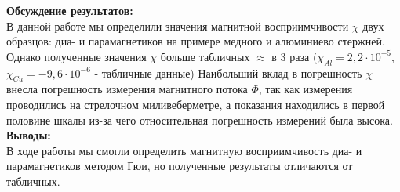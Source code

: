 \documentclass[a4paper, 12pt]{article}%
\begin{document}
	\newpage
	
	\textbf{Обсуждение результатов: }\\
	
	В данной работе мы определили значения магнитной восприимчивости $\chi$ двух образцов: диа- и парамагнетиков на примере медного и алюминиево стержней.
	Однако полученные значения $\chi$ больше табличных $\approx$ в 3 раза ($\chi_{Al} = 2,2 \cdot 10^{-5}$,   $\chi_{Cu} = -9,6 \cdot 10^{-6}$ - табличные данные)
	Наибольший вклад в погрешность $\chi$ внесла погрешность измерения магнитного потока $\Phi$, так как измерения проводились на стрелочном миливеберметре, а показания находились в первой половине шкалы из-за чего относительная погрешность измерений была высока.\\
	
	\textbf{Выводы: }\\
	
	В ходе работы мы смогли определить магнитную восприимчивость диа- и парамагнетиков методом Гюи, но полученные результаты отличаются от табличных. 
\end{document}
